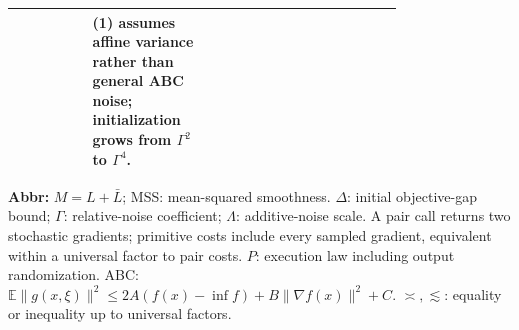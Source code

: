 \begin{table}[tp]
\begin{threeparttable}
\begin{tabularx}{\linewidth}{@{}>{\raggedright\arraybackslash}p{0.20\linewidth}>{\raggedright\arraybackslash}p{0.32\linewidth}>{\raggedright\arraybackslash}p{0.25\linewidth}>{\raggedright\arraybackslash}X@{}}
& \textbf{(1)} assumes affine variance rather than general ABC noise; initialization grows from $\Gamma^2$ to $\Gamma^4$. \\
\bottomrule
\end{tabularx}
\begin{tablenotes}[flushleft]\footnotesize
\item[] \textbf{Abbr:} $M=L+\bar L$; MSS: mean-squared smoothness. $\Delta$: initial objective-gap bound; $\Gamma$: relative-noise coefficient; $\Lambda$: additive-noise scale. A pair call returns two stochastic gradients; primitive costs include every sampled gradient, equivalent within a universal factor to pair costs. $P$: execution law including output randomization. ABC: $\mathbb E\|g(x,\xi)\|^2\le2A(f(x)-\inf f)+B\|\nabla f(x)\|^2+C$. $\asymp,\lesssim$: equality or inequality up to universal factors.
\end{tablenotes}
\end{threeparttable}
\end{table}
\clearpage
